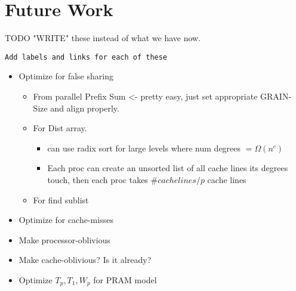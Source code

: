 \section{Future Work}

TODO "WRITE" these instead of what we have now.
\begin{verbatim}
Add labels and links for each of these
\end{verbatim}
\begin{itemize}
    \item Optimize for false sharing
        \begin{itemize}
            \item From parallel Prefix Sum <- pretty easy, just set appropriate GRAIN-Size and align properly.
            \item For Dist array.
                \begin{itemize}
                    \item can use radix sort for large levels where num degrees $= \Omega(n^c)$
                    \item Each proc can create an unsorted list of all cache lines its degrees touch, then each proc takes \#$cachelines /p$ cache lines
                \end{itemize}
            \item For find sublist
       \end{itemize}
   \item Optimize for cache-misses
   \item Make processor-oblivious
   \item Make cache-oblivious?  Is it already?
   \item Optimize $T_p,T_1,W_p$ for PRAM model
\end{itemize}

